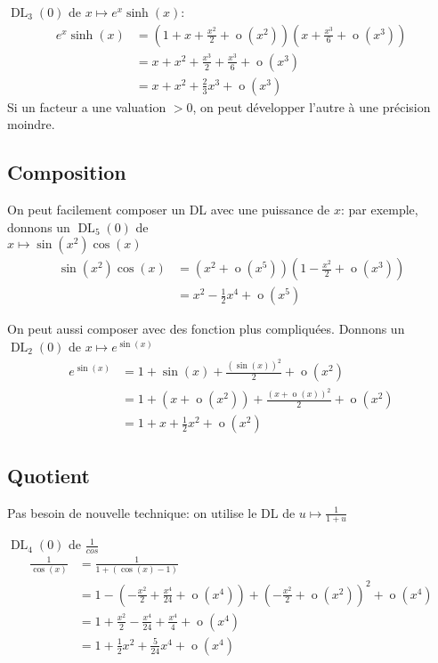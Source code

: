 \documentclass[10pt,a4paper]{article}
\theoremstyle{definition}
\DeclareMathOperator*{\negl}{o}
\DeclareMathOperator{\dl}{DL}
\begin{document}
$\dl_3(0)$ de $x \mapsto e^x \sinh(x)$:
\begin{align*}
e^x \sinh(x) &= \left(1 + x + \frac{x^2}{2} + \negl(x^2)\right)\left(x + \frac{x^3}{6} + \negl(x^3)\right) \\
&= x + x^2 + \frac{x^3}{2} + \frac{x^3}{6} + \negl(x^3) \\
&= x + x^2 + \frac{2}{3} x^3 + \negl(x^3)
\end{align*}
Si un facteur a une valuation $> 0$, on peut développer l'autre à une précision moindre.

\subsection{Composition}
On peut facilement composer un DL avec une puissance de $x$: par exemple, donnons un $\dl_5(0)$ de \\
$x \mapsto \sin(x^2) \cos(x)$
\begin{align*}
\sin(x^2) \cos(x) &= (x^2 + \negl(x^5))(1 - \frac{x^2}{2} + \negl(x^3)) \\
&= x^2 - \frac{1}{2} x^4 + \negl(x^5)
\end{align*} \medskip

On peut aussi composer avec des fonction plus compliquées. Donnons  un $\dl_2(0)$ de $x \mapsto e^{\sin(x)}$
\begin{align*}
e^{\sin(x)} &= 1 + \sin(x) + \frac{(\sin(x))^2}{2} + \negl(x^2) \\
&= 1 + (x + \negl(x^2)) + \frac{(x + \negl(x))^2}{2} + \negl(x^2) \\
&= 1 + x + \frac{1}{2} x^2 + \negl(x^2)
\end{align*}

\pagebreak

\subsection{Quotient}
Pas besoin de nouvelle technique: on utilise le DL de $u \mapsto \frac{1}{1 + u}$ \medskip

$\dl_4(0)$ de $\frac{1}{cos}$
\begin{align*}
\frac{1}{\cos(x)} &= \frac{1}{1 + (\cos(x) - 1)} \\
&= 1 - \left(- \frac{x^2}{2} + \frac{x^4}{24} + \negl(x^4)\right) + \left(- \frac{x^2}{2} + \negl(x^2)\right)^2 + \negl(x^4) \\
&= 1 + \frac{x^2}{2} - \frac{x^4}{24} + \frac{x^4}{4} + \negl(x^4) \\
&= 1 + \frac{1}{2} x^2 + \frac{5}{24} x^4 + \negl(x^4)
\end{align*} \medskip
\end{document}
